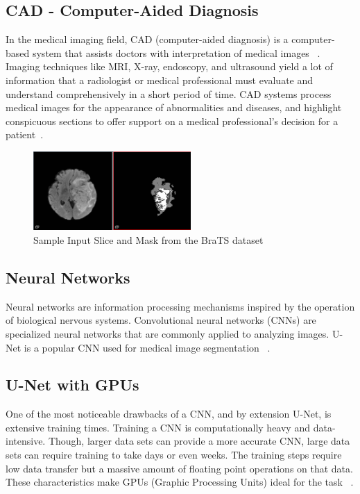 \documentclass[conference]{IEEEtran}
\begin{document}
\subsection{CAD - Computer-Aided Diagnosis}
In the medical imaging field, CAD (computer-aided diagnosis) is a computer-based system that assists doctors with interpretation of medical images ~\cite{doi2007computer}. Imaging techniques like MRI, X-ray, endoscopy, and ultrasound yield a lot of information that a radiologist or medical professional must evaluate and understand comprehensively in a short period of time. CAD systems process medical images for the appearance of abnormalities and diseases, and highlight conspicuous sections to offer support on a medical professional’s decision for a patient~\cite{doi2007computer}.

\begin{figure}[htpb]
    \centering
    \includegraphics[width=\textwidth,height=3cm,keepaspectratio=true]{Screenshot (7).png}
    \caption{
        Sample Input Slice and Mask from the BraTS dataset ~\cite{menze2014multimodal} ~\cite{bakas2017advancing} ~\cite{bakas2018identifying} 
    }
\end{figure}

\subsection{Neural Networks}
Neural networks are information processing mechanisms inspired by the operation of biological nervous systems. Convolutional neural networks (CNNs) are specialized neural networks that are commonly applied to analyzing images. U-Net is a popular CNN used for medical image segmentation ~\cite{ronneberger2015u}. 


\subsection{U-Net with GPUs}
One of the most noticeable drawbacks of a CNN, and by extension U-Net, is extensive training times. Training a CNN is computationally heavy and data-intensive. Though, larger data sets can provide a more accurate CNN, large data sets can require training to take days or even weeks. The training steps require low data transfer but a massive amount of floating point operations on that data. These characteristics make GPUs (Graphic Processing Units) ideal for the task ~\cite{strigl2010performance}.
\end{document}
